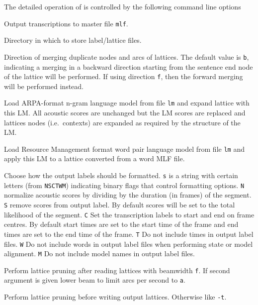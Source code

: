 The detailed operation of  is controlled by the following
command line options
\begin{optlist}

   Output transcriptions to master file \texttt{mlf}.

   Directory in which to store label/lattice files.

   Direction of merging duplicate nodes and arcs of
  lattices. The default value is \texttt{b}, indicating a merging in
  a backward direction starting from the sentence end node of the
  lattice will be performed. If using direction \texttt{f}, then the
  forward merging will be performed instead. 

   Load ARPA-format n-gram language model from file
  \texttt{lm} and expand lattice with this LM. All acoustic scores are
  unchanged but the LM scores are replaced and lattices nodes (i.e.\
  contexts) are expanded as required by the structure of the LM.

   Load Resource Management format word pair language
  model from file \texttt{lm} and apply this LM to a lattice converted
  from a word MLF file. 

   Choose how the output labels should be formatted.
        \texttt{s} is a string with certain letters (from \texttt{NSCTWM})
        indicating binary flags that control formatting options.
        \texttt{N} normalize acoustic scores by dividing by the duration
        (in frames) of the segment.
        \texttt{S} remove scores from output label.  By default 
        scores will be set to the total likelihood of the segment.
        \texttt{C} Set the transcription labels to start and end on
        frame centres. By default start times are set to the start
        time of the frame and end times are set to the end time of 
        the frame.
        \texttt{T} Do not include times in output label files.
        \texttt{W} Do not include words in output label files
        when performing state or model alignment.
        \texttt{M} Do not include model names in output label
        files.

   Perform lattice pruning after reading lattices with
  beamwidth \texttt{f}. If second argument is given lower beam to
  limit arcs per second to \texttt{a}.

   Perform lattice pruning before writing output
  lattices. Otherwise like \texttt{-t}.


\end{optlist}
